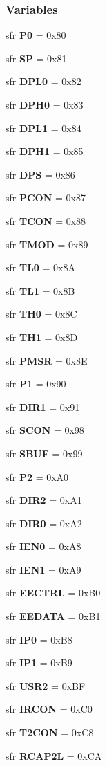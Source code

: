 \subsubsection*{Variables}
\begin{DoxyCompactItemize}
\item 
sfr {\bf P0} = 0x80
\item 
sfr {\bf SP} = 0x81
\item 
sfr {\bf D\+P\+L0} = 0x82
\item 
sfr {\bf D\+P\+H0} = 0x83
\item 
sfr {\bf D\+P\+L1} = 0x84
\item 
sfr {\bf D\+P\+H1} = 0x85
\item 
sfr {\bf D\+PS} = 0x86
\item 
sfr {\bf P\+C\+ON} = 0x87
\item 
sfr {\bf T\+C\+ON} = 0x88
\item 
sfr {\bf T\+M\+OD} = 0x89
\item 
sfr {\bf T\+L0} = 0x8A
\item 
sfr {\bf T\+L1} = 0x8B
\item 
sfr {\bf T\+H0} = 0x8C
\item 
sfr {\bf T\+H1} = 0x8D
\item 
sfr {\bf P\+M\+SR} = 0x8E
\item 
sfr {\bf P1} = 0x90
\item 
sfr {\bf D\+I\+R1} = 0x91
\item 
sfr {\bf S\+C\+ON} = 0x98
\item 
sfr {\bf S\+B\+UF} = 0x99
\item 
sfr {\bf P2} = 0x\+A0
\item 
sfr {\bf D\+I\+R2} = 0x\+A1
\item 
sfr {\bf D\+I\+R0} = 0x\+A2
\item 
sfr {\bf I\+E\+N0} = 0x\+A8
\item 
sfr {\bf I\+E\+N1} = 0x\+A9
\item 
sfr {\bf E\+E\+C\+T\+RL} = 0x\+B0
\item 
sfr {\bf E\+E\+D\+A\+TA} = 0x\+B1
\item 
sfr {\bf I\+P0} = 0x\+B8
\item 
sfr {\bf I\+P1} = 0x\+B9
\item 
sfr {\bf U\+S\+R2} = 0x\+BF
\item 
sfr {\bf I\+R\+C\+ON} = 0x\+C0
\item 
sfr {\bf T2\+C\+ON} = 0x\+C8
\item 
sfr {\bf R\+C\+A\+P2L} = 0x\+CA
\item 

\end{DoxyCompactItemize}
